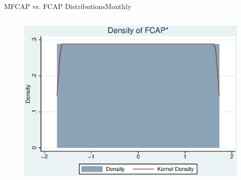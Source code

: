 \documentclass[handout]{beamer}
\begin{document}
\begin{frame}{MFCAP vs. FCAP Distributions}{Monthly}
\begin{columns}
\begin{figure}
						\includegraphics[width=\linewidth]{"Output/MHistNFCAP.eps"}   \end{figure}            
				\end{columns}
			\end{frame}
			
			
	
\end{document}
